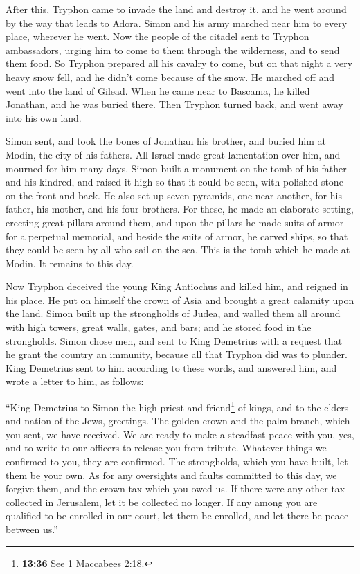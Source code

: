  After this, Tryphon came to invade the land and destroy
it, and he went around by the way that leads to Adora. Simon and his
army marched near him to every place, wherever he went. 
Now the people of the citadel sent to Tryphon ambassadors, urging him to
come to them through the wilderness, and to send them food.
 So Tryphon prepared all his cavalry to come, but on that
night a very heavy snow fell, and he didn't come because of the snow. He
marched off and went into the land of Gilead.  When he
came near to Bascama, he killed Jonathan, and he was buried there.
 Then Tryphon turned back, and went away into his own
land.

 Simon sent, and took the bones of Jonathan his brother,
and buried him at Modin, the city of his fathers.  All
Israel made great lamentation over him, and mourned for him many days.
 Simon built a monument on the tomb of his father and his
kindred, and raised it high so that it could be seen, with polished
stone on the front and back.  He also set up seven
pyramids, one near another, for his father, his mother, and his four
brothers.  For these, he made an elaborate setting,
erecting great pillars around them, and upon the pillars he made suits
of armor for a perpetual memorial, and beside the suits of armor, he
carved ships, so that they could be seen by all who sail on the sea.
 This is the tomb which he made at Modin. It remains to
this day.

 Now Tryphon deceived the young King Antiochus and killed
him,  and reigned in his place. He put on himself the
crown of Asia and brought a great calamity upon the land.
 Simon built up the strongholds of Judea, and walled them
all around with high towers, great walls, gates, and bars; and he stored
food in the strongholds.  Simon chose men, and sent to
King Demetrius with a request that he grant the country an immunity,
because all that Tryphon did was to plunder.  King
Demetrius sent to him according to these words, and answered him, and
wrote a letter to him, as follows:

 ``King Demetrius to Simon the high priest and
friend\footnote{\textbf{13:36} See 1 Maccabees 2:18.} of kings, and to
the elders and nation of the Jews, greetings.  The golden
crown and the palm branch, which you sent, we have received. We are
ready to make a steadfast peace with you, yes, and to write to our
officers to release you from tribute.  Whatever things we
confirmed to you, they are confirmed. The strongholds, which you have
built, let them be your own.  As for any oversights and
faults committed to this day, we forgive them, and the crown tax which
you owed us. If there were any other tax collected in Jerusalem, let it
be collected no longer.  If any among you are qualified
to be enrolled in our court, let them be enrolled, and let there be
peace between us.''

